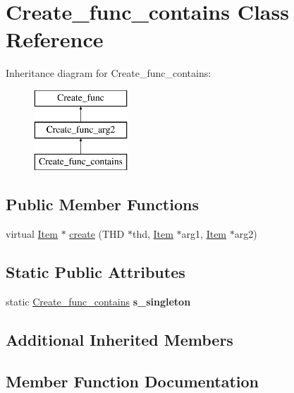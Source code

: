 \hypertarget{classCreate__func__contains}{}\section{Create\+\_\+func\+\_\+contains Class Reference}
\label{classCreate__func__contains}
Inheritance diagram for Create\+\_\+func\+\_\+contains\+:\begin{figure}[H]
\begin{center}
\leavevmode
\includegraphics[height=3.000000cm]{classCreate__func__contains}
\end{center}
\end{figure}
\subsection*{Public Member Functions}
\begin{DoxyCompactItemize}
\item 
virtual \mbox{\hyperlink{classItem}{Item}} $\ast$ \mbox{\hyperlink{classCreate__func__contains_aa892f88fe4b3821738131902af24efa9}{create}} (T\+HD $\ast$thd, \mbox{\hyperlink{classItem}{Item}} $\ast$arg1, \mbox{\hyperlink{classItem}{Item}} $\ast$arg2)
\end{DoxyCompactItemize}
\subsection*{Static Public Attributes}
\begin{DoxyCompactItemize}
\item 
\mbox{\label{classCreate__func__contains_a67e526ad6f5eaf5b28694f294642c2ac}} 
static \mbox{\hyperlink{classCreate__func__contains}{Create\+\_\+func\+\_\+contains}} {\bfseries s\+\_\+singleton}
\end{DoxyCompactItemize}
\subsection*{Additional Inherited Members}


\subsection{Member Function Documentation}
\mbox{\label{classCreate__func__contains_aa892f88fe4b3821738131902af24efa9}} 
